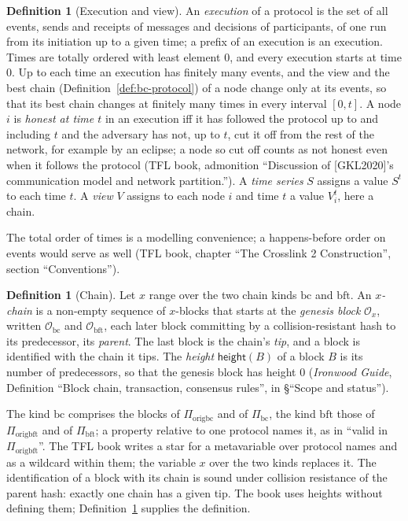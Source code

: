 \documentclass[11pt,a4paper]{article}
\theoremstyle{definition}
\newtheorem{definition}[theorem]{Definition}
\newcommand{\bc}{\mathrm{bc}}
\newcommand{\bft}{\mathrm{bft}}
\newcommand{\Origin}{\mathcal{O}}
\newcommand{\Obc}{\Origin_{\bc}}
\newcommand{\Obft}{\Origin_{\bft}}
\newcommand{\Piorigbc}{\Pi_{\mathrm{origbc}}}
\newcommand{\Piorigbft}{\Pi_{\mathrm{origbft}}}
\newcommand{\Pibc}{\Pi_{\bc}}
\newcommand{\Pibft}{\Pi_{\bft}}
\begin{document}
\begin{definition}[Execution and view]\label{def:exec}
An \emph{execution} of a protocol is the set of all events, sends and
receipts of messages and decisions of participants, of one run from its
initiation up to a given time; a prefix of an execution is an execution.
Times are totally ordered with least element $0$, and every execution starts
at time $0$. Up to each time an execution has finitely many events, and the
view and the best chain (Definition~\ref{def:bc-protocol}) of a node change
only at its events, so that its best chain changes at finitely many times in
every interval $[0, t]$. A node $i$ is \emph{honest at time $t$} in an
execution iff it has followed the protocol up to and including $t$ and the
adversary has not, up to $t$, cut it off from the rest of the network, for
example by an eclipse; a node so cut off counts as not honest even when it
follows the protocol (TFL book, admonition ``Discussion of [GKL2020]'s
communication model and network partition.''). A \emph{time series} $S$
assigns a value $S^t$ to each time $t$. A \emph{view} $V$ assigns to each node
$i$ and time $t$ a value $V_i^t$, here a chain.
\end{definition}

The total order of times is a modelling convenience; a happens-before order
on events would serve as well (TFL book, chapter ``The Crosslink 2
Construction'', section ``Conventions'').

\begin{definition}[Chain]\label{def:chain}
Let $x$ range over the two chain kinds $\bc$ and $\bft$. An
\emph{$x$-chain} is a non-empty sequence of $x$-blocks that starts at the
\emph{genesis block} $\Origin_x$, written $\Obc$ and $\Obft$, each later
block committing by a collision-resistant hash to its predecessor, its
\emph{parent}. The last block is the chain's \emph{tip}, and a block is
identified with the chain it tips. The \emph{height} $\mathsf{height}(B)$
of a block $B$ is its number of predecessors, so that the genesis block has
height $0$ (\emph{Ironwood Guide}, Definition ``Block chain, transaction,
consensus rules'', in \S``Scope and status'').
\end{definition}

The kind $\bc$ comprises the blocks of $\Piorigbc$ and of $\Pibc$, the kind
$\bft$ those of $\Piorigbft$ and of $\Pibft$; a property relative to one
protocol names it, as in ``valid in $\Piorigbft$''. The TFL book writes a
star for a metavariable over protocol names and as a wildcard within them;
the variable $x$ over the two kinds replaces it. The identification of a
block with its chain is sound under collision resistance of the parent hash:
exactly one chain has a given tip. The book uses heights without defining
them; Definition~\ref{def:chain} supplies the definition.
\end{document}
